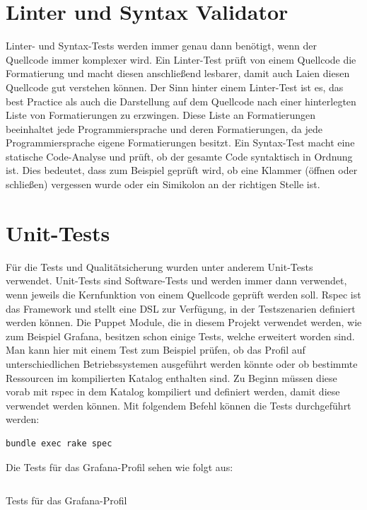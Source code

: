 \section{Linter und Syntax Validator}
Linter- und Syntax-Tests werden immer genau dann benötigt, wenn der Quellcode
immer komplexer wird. Ein Linter-Test prüft von einem Quellcode die
Formatierung und macht diesen anschließend lesbarer, damit auch Laien diesen
Quellcode gut verstehen können. Der Sinn hinter einem Linter-Test ist es, das
best Practice als auch die Darstellung auf dem Quellcode nach einer
hinterlegten Liste von Formatierungen zu erzwingen. Diese Liste an
Formatierungen beeinhaltet jede Programmiersprache und deren Formatierungen,
da jede Programmiersprache eigene Formatierungen besitzt. Ein Syntax-Test macht
eine statische Code-Analyse und prüft, ob der gesamte Code syntaktisch in
Ordnung ist. Dies bedeutet, dass zum Beispiel geprüft wird, ob eine Klammer
(öffnen oder schließen) vergessen wurde oder ein Simikolon an der richtigen
Stelle ist.
\mr%

\section{Unit-Tests}
Für die Tests und Qualitätsicherung wurden unter anderem Unit-Tests verwendet.
Unit-Tests sind Software-Tests und werden immer dann verwendet, wenn jeweils
die Kernfunktion von einem Quellcode geprüft werden soll. Rspec ist das
Framework und stellt eine \gls{DSL} zur Verfügung, in der Testszenarien
definiert werden können. Die Puppet Module, die in diesem Projekt verwendet
werden, wie zum Beispiel Grafana, besitzen schon einige Tests, welche erweitert
worden sind. Man kann hier mit einem Test zum Beispiel prüfen, ob das Profil
auf unterschiedlichen Betriebssystemen ausgeführt werden könnte oder ob
bestimmte Ressourcen im kompilierten Katalog enthalten sind. Zu Beginn müssen
diese vorab mit rspec in dem Katalog kompiliert und definiert werden, damit
diese verwendet werden können. Mit folgendem Befehl können die Tests
durchgeführt werden:
\begin{lstlisting}[language=bash]
bundle exec rake spec
\end{lstlisting}

Die Tests für das Grafana-Profil sehen wie folgt aus:

\begin{listing}[H]
  \inputminted{ruby}{../listings/rspec-grafana.txt}
  \caption{Tests für das Grafana-Profil}
\end{listing}

